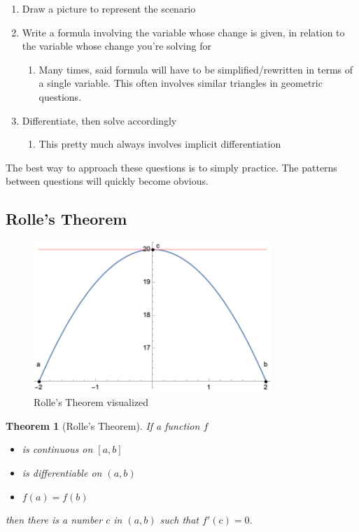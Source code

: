 \documentclass[12pt]{article}
\newtheorem*{theorem}{Theorem}
\begin{document}
\begin{enumerate}
    \item Draw a picture to represent the scenario
    \item Write a formula involving the variable whose change is given, in relation to the variable whose change you're solving for
    \begin{enumerate}
        \item Many times, said formula will have to be simplified/rewritten in terms of a single variable. This often involves similar triangles in geometric questions.
    \end{enumerate}
    \item Differentiate, then solve accordingly
    \begin{enumerate}
        \item This pretty much always involves implicit differentiation
    \end{enumerate}
\end{enumerate}

The best way to approach these questions is to simply practice. The patterns between questions will quickly become obvious.
\subsection{Rolle's Theorem}
\begin{figure}[!ht]
    \centering
    \includegraphics[width=9cm]{misc/rolles.png}
    \caption{Rolle's Theorem visualized}
    \label{fig:rolles}
\end{figure}

\begin{theorem}[Rolle's Theorem]
If a function $f$
\begin{itemize}
    \item is \textit{continuous} on $[a,b]$
    \item is \textit{differentiable} on $(a,b)$
    \item $f(a) = f(b)$
\end{itemize}
then there is a number $c$ in $(a,b)$ such that $f'(c) = 0$.
\end{theorem}
\end{document}
